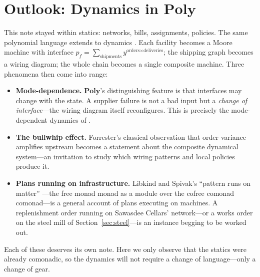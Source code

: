 \documentclass[11pt,a4paper]{article}
\newcommand{\Poly}{\mathbf{Poly}}
\theoremstyle{plain}
\theoremstyle{definition}
\theoremstyle{remark}
\begin{document}
\section{Outlook: Dynamics in \texorpdfstring{$\Poly$}{Poly}}\label{sec:outlook}

This note stayed within statics: networks, bills, assignments,
policies. The same polynomial language extends to dynamics
\cite{spivak-poly, niu-spivak}. Each facility becomes a Moore machine
with interface $p_f = \sum_{\text{shipments}} y^{\text{orders} \times
\text{deliveries}}$; the shipping graph becomes a wiring diagram; the
whole chain becomes a single composite machine. Three phenomena then
come into range:

\begin{itemize}[nosep]
\item \textbf{Mode-dependence.} $\Poly$'s distinguishing feature is
  that interfaces may change with the state. A supplier failure is not
  a bad input but a \emph{change of interface}---the wiring diagram
  itself reconfigures. This is precisely the mode-dependent dynamics
  of \cite{spivak-poly}.
\item \textbf{The bullwhip effect.} Forrester's classical observation
  \cite{forrester} that order variance amplifies upstream becomes a
  statement about the composite dynamical system---an invitation to
  study which wiring patterns and local policies produce it.
\item \textbf{Plans running on infrastructure.} Libkind and Spivak's
  ``pattern runs on matter'' \cite{libkind-spivak}---the free monad
  monad as a module over the cofree comonad comonad---is a general
  account of plans executing on machines. A replenishment order
  running on Sawasdee Cellars' network---or a works order on the
  steel mill of Section~\ref{sec:steel}---is an instance begging to
  be worked out.
\end{itemize}

Each of these deserves its own note. Here we only observe that the
statics were already comonadic, so the dynamics will not require a
change of language---only a change of gear.
\end{document}
